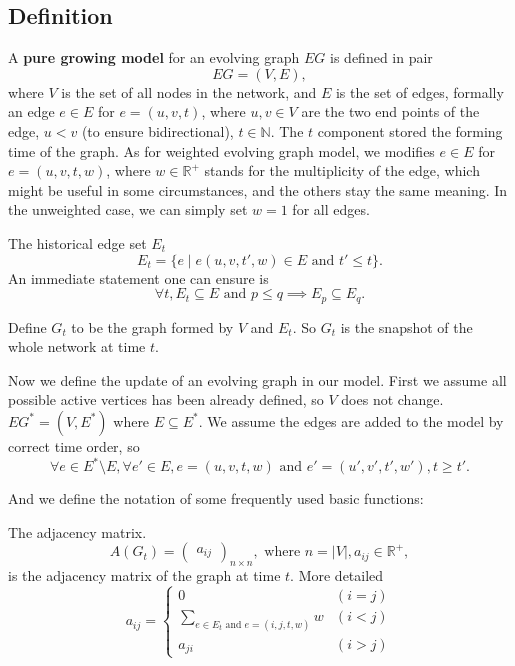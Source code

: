 \documentclass[12pt,abstract=true]{scrartcl}
\numberwithin{equation}{section}
\theoremstyle{definition}   \newtheorem{definition}{Definition}[section]
\theoremstyle{plain}        \newtheorem{theorem}{Theorem}[section]
\theoremstyle{plain}        \newtheorem{observation}{Observation}[section]
\theoremstyle{plain}        \newtheorem{fact}{Fact}[section]
\theoremstyle{plain}        \newtheorem{claim}{Claim}[section]
\theoremstyle{plain}        \newtheorem{lemma}[theorem]{Lemma}
\theoremstyle{plain}        \newtheorem{corollary}[theorem]{Corollary}
\theoremstyle{remark}       \newtheorem{example}{Example}[section]
\theoremstyle{remark}       \newtheorem{remark}{Remark}[section]
\begin{document}
\subsection{Definition}
 A \textbf{pure growing model} for an evolving graph $EG$ is defined
in pair \begin{equation}
EG=(V,E),
\end{equation}
where $V$ is the set of all nodes in the network, and $E$
is the set of edges, formally an edge $e\in E$ for $e=(u,v,t)$,
where $u,v\in V$ are the two end points of the edge, $u<v$ (to ensure
bidirectional), $t\in \mathbb{N}$. The $t$ component stored the forming time of
the graph. As for weighted evolving graph model, we modifies $e\in E$ for
$e=(u,v,t,w)$, where $w\in\mathbb{R}^+$ stands for the multiplicity of the
edge, which might be useful in some circumstances, and the others stay the same
meaning. In the unweighted case, we can simply set $w=1$ for all edges.

 The historical edge set $E_t$
\begin{equation}
E_t=\{e\;|\;e(u,v,t',w)\in E\text{ and }t'\leq t\}.
\end{equation}
An immediate statement one can ensure is
\begin{equation}
\forall t, E_t\subseteq E\text{ and }p\leq q\implies E_p\subseteq E_q.
\end{equation}

Define $G_t$ to be the graph formed by $V$ and $E_t$. So $G_t$ is the snapshot
of the whole network at time $t$.

Now we define the update of an evolving graph in our model. First we assume all
possible active vertices has been already defined, so $V$ does not change.
$EG^*=(V,E^*)$ where $E\subseteq E^*$. We assume the edges are added to the
model by correct time order, so
\begin{equation}
\forall e\in E^*\setminus E, \forall e'\in E, e=(u,v,t,w)\text{ and }
e'=(u',v',t',w'), t\geq t'.
\end{equation}

And we define the notation of some frequently used basic functions:

 The adjacency matrix.
\begin{equation}
A(G_t)=\begin{pmatrix}a_{ij}\end{pmatrix}_{n\times n},\text{ where }n=|V|,
a_{ij}\in \mathbb{R}^+,
\end{equation}
is the adjacency matrix of the graph at time $t$. More detailed
\begin{equation}
a_{ij}=\begin{cases}
0&(i=j)\\
\sum_{e\in E_t\text{ and }e=(i,j,t,w)}w &(i<j)\\
a_{ji}&(i>j)
\end{cases}
\end{equation}
\end{document}
